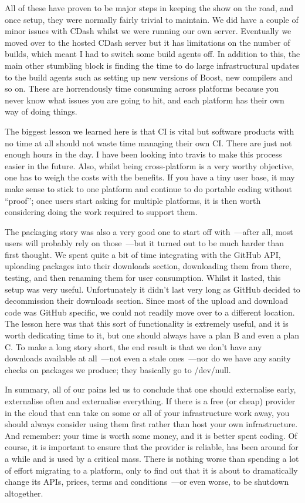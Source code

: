 \documentclass{book}
\begin{document}
All of these have proven to be major steps in keeping the show on the
road, and once setup, they were normally fairly trivial to
maintain. We did have a couple of minor issues with CDash whilst we
were running our own server. Eventually we moved over to the hosted
CDash server but it has limitations on the number of builds, which
meant I had to switch some build agents off. In addition to this, the
main other stumbling block is finding the time to do large
infrastructural updates to the build agents such as setting up new
versions of Boost, new compilers and so on. These are horrendously
time consuming across platforms because you never know what issues you
are going to hit, and each platform has their own way of doing things.

The biggest lesson we learned here is that CI is vital but software
products with no time at all should not waste time managing their own
CI. There are just not enough hours in the day. I have been looking
into travis to make this process easier in the future. Also, whilst
being cross-platform is a very worthy objective, one has to weigh the
costs with the benefits. If you have a tiny user base, it may make
sense to stick to one platform and continue to do portable coding
without ``proof''; once users start asking for multiple platforms, it
is then worth considering doing the work required to support them.

The packaging story was also a very good one to start off with~---after
all, most users will probably rely on those~---but it turned out to be
much harder than first thought. We spent quite a bit of time
integrating with the GitHub API, uploading packages into their
downloads section, downloading them from there, testing, and then
renaming them for user consumption. Whilst it lasted, this setup was
very useful. Unfortunately it didn't last very long as GitHub decided
to decommission their downloads section. Since most of the upload and
download code was GitHub specific, we could not readily move over to a
different location. The lesson here was that this sort of
functionality is extremely useful, and it is worth dedicating time to
it, but one should always have a plan B and even a plan C. To make a
long story short, the end result is that we don't have any downloads
available at all~---not even a stale ones~---nor do we have any sanity
checks on packages we produce; they basically go to /dev/null.

In summary, all of our pains led us to conclude that one should
externalise early, externalise often and externalise everything. If
there is a free (or cheap) provider in the cloud that can take on some
or all of your infrastructure work away, you should always consider
using them first rather than host your own infrastructure. And
remember: your time is worth some money, and it is better spent
coding. Of course, it is important to ensure that the provider is
reliable, has been around for a while and is used by a critical
mass. There is nothing worse than spending a lot of effort migrating
to a platform, only to find out that it is about to dramatically
change its APIs, prices, terms and conditions~---or even worse, to be
shutdown altogether.
\end{document}
